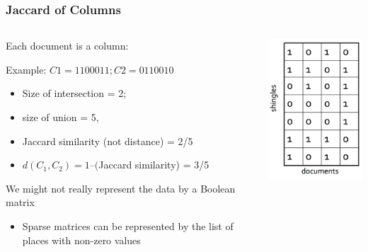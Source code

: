 \documentclass[svgnames]{beamer}
\begin{document}
\begin{frame} \frametitle{Jaccard of Columns}

 \begin{columns}[T]
  \begin{column}{0.5\textwidth}
  Each document is a column:

  {\scriptsize
  \begin{block}{Example: $C1 = 1100011; C2 = 0110010$}
  \scriptsize
  \begin{itemize}
  \scriptsize
  \item Size of intersection = 2; 
  \item size of union = 5, 
  \item Jaccard similarity (not distance) = 2/5
  \item $d(C_1,C_2) = 1 – ($Jaccard similarity) = 3/5
  \end{itemize}
  \end{block}}  

  We might not really represent the data by a Boolean matrix
  \begin{itemize}
  \item Sparse matrices can be represented by the list of places with non-zero values
  \end{itemize}
  \end{column}
  \begin{column}{0.5\textwidth}
   \includegraphics[width=5cm]{matrix}
  \end{column}
 \end{columns}

\end{frame}

  
\end{document}
